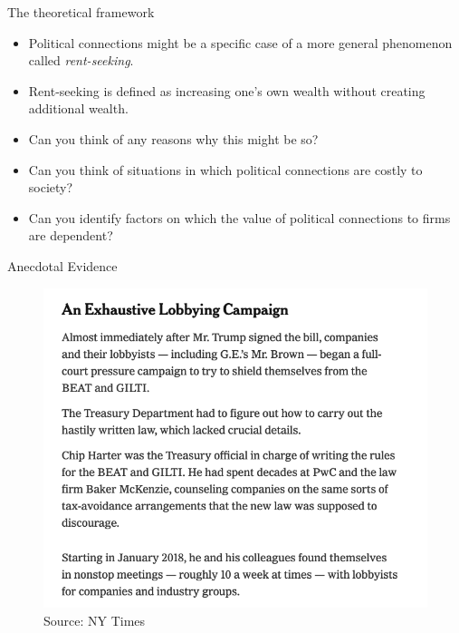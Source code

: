 \documentclass[aspectratio = 169, 12pt]{beamer}
\begin{document}
	\begin{frame}{The theoretical framework}
	    \begin{itemize}
	        \item Political connections might be a specific case of a more general phenomenon called \textit{rent-seeking}.
	        \item Rent-seeking is defined as increasing one's own wealth without creating additional wealth. 
	        \item Can you think of any reasons why this might be so? 
	        \item Can you  think of situations in which political connections are costly to society? 
	        \item Can you identify factors on which the value of political connections to firms are dependent?
	    \end{itemize}
	\end{frame}
	
	\begin{frame}{Anecdotal Evidence}
	    \begin{figure}
	        \centering
	        \includegraphics[scale = 0.33]{screen5.png}
	        \caption{Source: NY Times}
	        \label{fig:my_label}
	    \end{figure}
	\end{frame}
	
\end{document}
